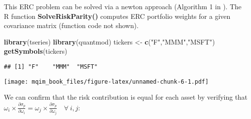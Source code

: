 \documentclass[]{book}
\newenvironment{Shaded}{\begin{snugshade}}{\end{snugshade}}
\newcommand{\KeywordTok}[1]{\textcolor[rgb]{0.13,0.29,0.53}{\textbf{#1}}}
\newcommand{\DataTypeTok}[1]{\textcolor[rgb]{0.13,0.29,0.53}{#1}}
\newcommand{\DecValTok}[1]{\textcolor[rgb]{0.00,0.00,0.81}{#1}}
\newcommand{\StringTok}[1]{\textcolor[rgb]{0.31,0.60,0.02}{#1}}
\newcommand{\OperatorTok}[1]{\textcolor[rgb]{0.81,0.36,0.00}{\textbf{#1}}}
\newcommand{\NormalTok}[1]{#1}
\theoremstyle{definition}
\theoremstyle{definition}
\theoremstyle{definition}
\theoremstyle{remark}
\begin{document}
This ERC problem can be solved via a newton approach (Algorithm 1 in
\citep{chaves2012}). The R function \textbf{SolveRiskParity()} computes
ERC portfolio weights for a given covariance matrix (function code not
shown).

\begin{Shaded}
\begin{Highlighting}[]
\KeywordTok{library}\NormalTok{(tseries)}
\KeywordTok{library}\NormalTok{(quantmod)}
\NormalTok{tickers <-}\StringTok{ }\KeywordTok{c}\NormalTok{(}\StringTok{"F"}\NormalTok{,}\StringTok{"MMM"}\NormalTok{,}\StringTok{"MSFT"}\NormalTok{)}
\KeywordTok{getSymbols}\NormalTok{(tickers)}
\end{Highlighting}
\end{Shaded}

\begin{verbatim}
## [1] "F"    "MMM"  "MSFT"
\end{verbatim}

\begin{Shaded}
\end{Shaded}

\texttt{[image: mqim\_book\_files/figure-latex/unnamed-chunk-6-1.pdf]}

We can confirm that the risk contribution is equal for each asset by
verifying that
\(\omega_i \times \frac{\partial \sigma_p}{\partial \omega_i} = \omega_j \times \frac{\partial \sigma_p}{\partial \omega_j} \quad \forall \ i, j\):
\end{document}
